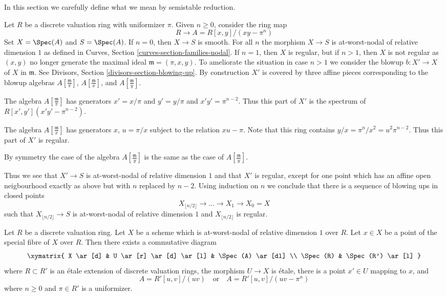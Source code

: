 \noindent
In this section we carefully define what we mean by semistable reduction.

\begin{example}
\label{example-blowup}
Let $R$ be a discrete valuation ring with uniformizer $\pi$.
Given $n \geq 0$, consider the ring map
$$
R \longrightarrow A = R[x, y]/(xy - \pi^n)
$$
Set $X = \Spec(A)$ and $S = \Spec(A)$.
If $n = 0$, then $X \to S$ is smooth.
For all $n$ the morphism $X \to S$ is at-worst-nodal
of relative dimension $1$ as defined in
Curves, Section \ref{curves-section-families-nodal}.
If $n = 1$, then $X$ is regular, but if $n > 1$, then $X$ is not
regular as $(x, y)$ no longer generate the maximal ideal
$\mathfrak m = (\pi, x, y)$. To ameliorate the situation
in case $n > 1$ we
consider the blowup $b : X' \to X$ of $X$ in $\mathfrak m$.
See Divisors, Section \ref{divisors-section-blowing-up}.
By construction $X'$ is covered by three affine pieces
corresponding to the blowup algebras $A[\frac{\mathfrak m}{\pi}]$,
$A[\frac{\mathfrak m}{x}]$, and $A[\frac{\mathfrak m}{y}]$.

\medskip\noindent
The algebra $A[\frac{\mathfrak m}{\pi}]$ has generators
$x' = x/\pi$ and $y' = y/\pi$ and $x'y' = \pi^{n - 2}$.
Thus this part of $X'$ is the spectrum of $R[x', y'](x'y' - \pi^{n - 2})$.

\medskip\noindent
The algebra $A[\frac{\mathfrak m}{x}]$ has generators $x$,
$u = \pi/x$ subject to the relation $xu - \pi$. Note that this ring
contains $y/x = \pi^n/x^2 = u^2\pi^{n - 2}$. Thus this part of
$X'$ is regular.

\medskip\noindent
By symmetry the case of the algebra $A[\frac{\mathfrak m}{y}]$ is
the same as the case of $A[\frac{\mathfrak m}{y}]$.

\medskip\noindent
Thus we see that $X' \to S$ is at-worst-nodal of relative dimension $1$
and that $X'$ is regular, except for one point which has an
affine open neigbourhood exactly as above but with $n$ replaced by $n - 2$.
Using induction on $n$ we conclude that there is a sequence of
blowing ups in closed points
$$
X_{\lfloor n/2 \rfloor} \to \ldots \to X_1 \to X_0 = X
$$
such that $X_{\lfloor n/2 \rfloor} \to S$ is
at-worst-nodal of relative dimension $1$ and
$X_{\lfloor n/2 \rfloor}$ is regular.
\end{example}

\begin{lemma}
\label{lemma-etale-local-at-worst-nodal}
Let $R$ be a discrete valuation ring. Let $X$ be a scheme which is
at-worst-nodal of relative dimension $1$ over $R$.
Let $x \in X$ be a point of the special fibre
of $X$ over $R$. Then there exists a commutative diagram
$$
\xymatrix{
X \ar[d] &
U \ar[r] \ar[d] \ar[l] &
\Spec(A) \ar[dl] \\
\Spec(R) &
\Spec(R') \ar[l]
}
$$
where $R \subset R'$ is an \'etale extension of discrete valuation rings,
the morphism $U \to X$ is \'etale, there is a
point $x' \in U$ mapping to $x$, and
$$
A = R'[u, v]/(uv)
\quad\text{or}\quad
A = R'[u, v]/(uv - \pi^n)
$$
where $n \geq 0$ and $\pi \in R'$ is a uniformizer.
\end{lemma}

